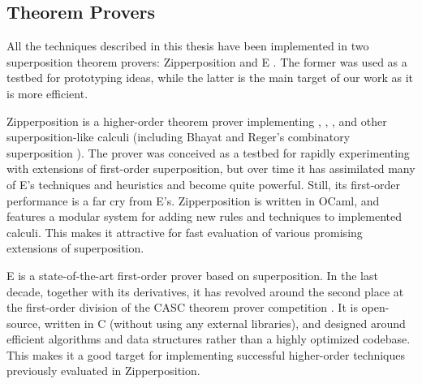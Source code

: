\subsection{Theorem Provers}
\label{sec:pre:theorem-provers}

All the techniques described in this thesis have been implemented in two superposition
theorem provers: Zipperposition
\cite{sc-15-simon-phd,sc-supind-17} and E \cite{ss-02-brainiac}. The former was used as a testbed for
prototyping ideas, while the latter is the main target of our work as it is more
efficient.

Zipperposition is a higher-order theorem prover implementing \lfsup{},
\lsup{}, \osup{}, and other superposition-like calculi (including Bhayat and
Reger's combinatory superposition \cite{br-20-full-sup-w-combs}). The prover was
conceived as a testbed for rapidly experimenting with extensions of first-order
superposition, but over time it has assimilated many of E's techniques and
heuristics and become quite powerful. Still, its first-order performance is a
far cry from E's. Zipperposition is written in OCaml, and features a modular
system for adding new rules and techniques to implemented calculi.
This makes it attractive for fast evaluation of various promising extensions of
superposition.

 E is a state-of-the-art first-order prover based on superposition.
In the last decade, together with its derivatives, it has revolved around the
second place at the first-order division of the CASC theorem prover
competition \cite{ss-96-casc}. It is open-source, written in C (without using any
external libraries), and designed around efficient algorithms and data structures
rather than a highly optimized codebase. This makes it a good target for implementing
successful higher-order techniques previously evaluated in Zipperposition.



